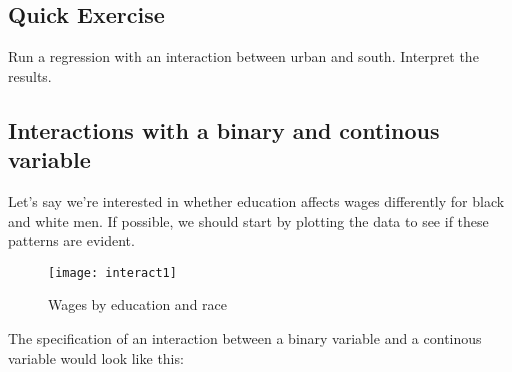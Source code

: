 \documentclass[12pt]{article}
\begin{document}
\subsection{Quick Exercise}

Run a regression with an interaction between urban and
south. Interpret the results.

\subsection{Interactions with a binary and continous variable}
\label{sec:inter-with-binary}

Let's say we're interested in whether education affects wages
differently for black and white men.  If possible, we should start by
plotting the data to see if these patterns are evident. 



\begin{figure}[h!]
  \centering
  \caption{Wages by education and race}
  \texttt{[image: interact1]}
\end{figure}


The specification of an
interaction between a binary variable and a continous variable would
look like this:
\end{document}
